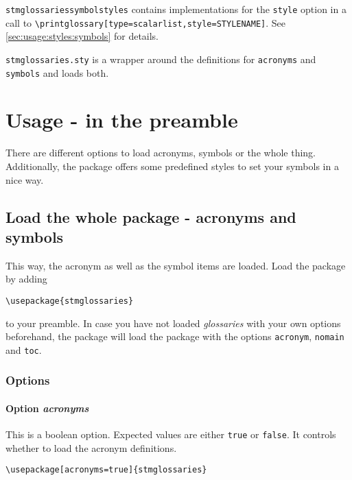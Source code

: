 \documentclass{scrartcl}
\begin{document}
\texttt{stmglossariessymbolstyles} contains implementations for the \texttt{style} option in a call to \verb+\printglossary[type=scalarlist,style=STYLENAME]+. See \autoref{sec:usage:styles:symbols} for details.

\texttt{stmglossaries.sty} is a wrapper around the definitions for \texttt{acronyms} and \texttt{symbols} and loads both.

\section{Usage - in the preamble}
\label{sec:usage:preamble}

There are different options to load acronyms, symbols or the whole thing. Additionally, the package offers some predefined styles to set your symbols in a nice way.

\subsection{Load the whole package - acronyms and symbols}
\label{sec:usage:preamble:wholepackage}

This way, the acronym as well as the symbol items are loaded. Load the package by adding

\begin{verbatim}
\usepackage{stmglossaries}
\end{verbatim}

to your preamble. In case you have not loaded \textit{glossaries} with your own options beforehand, the package will load the package with the options \texttt{acronym}, \texttt{nomain} and \texttt{toc}.

\subsubsection{Options}
\label{sec:usage:preamble:wholepackage:options}

\paragraph{Option \protect\textit{acronyms}}
\label{sec:usage:preamble:wholepackage:options:acronyms}

This is a boolean option. Expected values are either \texttt{true} or \texttt{false}. It controls whether to load the acronym definitions.

\begin{verbatim}
\usepackage[acronyms=true]{stmglossaries}
\end{verbatim}
\end{document}
